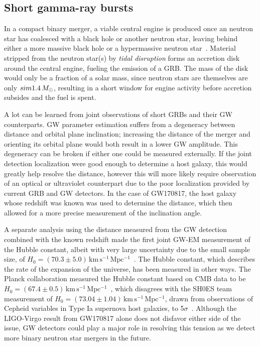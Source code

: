 \subsection{Short gamma-ray bursts}

In a compact binary merger, a viable central engine is produced once an neutron star has coalesced with a black hole or another neutron star, leaving behind either a more massive black hole or a hypermassive neutron star~\citep{Eichler_1989,Nakar_2007}.
Material stripped from the neutron star(s) by \textit{tidal disruption} forms an accretion disk around the central engine, fueling the emission of a GRB.
The mass of the disk would only be a fraction of a solar mass, since neutron stars are themselves are only $sim 1.4\,M_{\odot}$, resulting in a short window for engine activity before accretion subsides and the fuel is spent.

A lot can be learned from joint observations of short GRBs and their GW counterparts.
\ac{GW} parameter estimation suffers from a degeneracy between distance and orbital plane inclination; increasing the distance of the merger and orienting its orbital plane would both result in a lower \ac{GW} amplitude.
This degeneracy can be broken if either one could be measured externally.
If the joint detection localization were good enough to determine a host galaxy, this would greatly help resolve the distance, however this will more likely require observation of an optical or ultraviolet counterpart due to the poor localization provided by current \ac{GRB} and \ac{GW} detectors.
In the case of GW170817, the host galaxy whose redshift was known was used to determine the distance, which then allowed for a more precise measurement of the inclination angle.

A separate analysis using the distance measured from the \ac{GW} detection combined with the known redshift made the first joint \ac{GW}-EM measurement of the Hubble constant, albeit with very large uncertainty due to the small sample size, of $H_0 = (70.3 \pm 5.0)\,\mathrm{km\,s^{-1}\,Mpc^{-1}}$~\citep{gw170817_hubble}.
The Hubble constant, which describes the rate of the expansion of the universe, has been measured in other ways.
The Planck collaboration measured the Hubble constant based on \ac{CMB} data to be $H_0 = (67.4 \pm 0.5)\,\mathrm{km\,s^{-1}\,Mpc^{-1}}$~\citep{Planck_2020},
which disagrees with the SH0ES team measurement of $H_0 = (73.04 \pm 1.04)\,\mathrm{km\,s^{-1}\,Mpc^{-1}}$, drawn from observations of Cepheid variables in Type Ia supernova host galaxies, to 5$\sigma$~\citep{Shoes_2018}.
Although the LIGO-Virgo result from GW170817 alone does not disfavor either side of the issue, GW detectors could play a major role in resolving this tension as we detect more binary neutron star mergers in the future.

